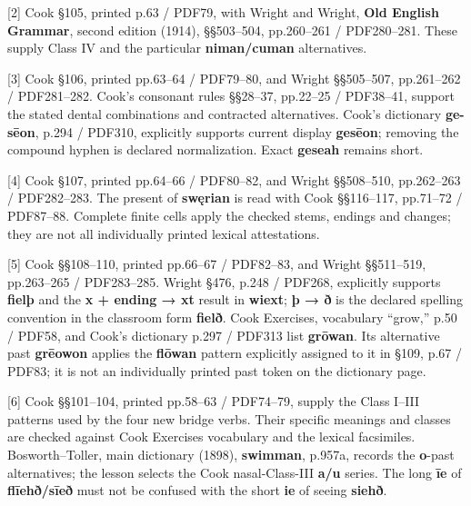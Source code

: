 [2] Cook §105, printed p.63 /\allowbreak{} PDF79, with Wright and Wright, \textbf{Old English Grammar}, second edition (1914), §§503–504, pp.260–261 /\allowbreak{} PDF280–281. These supply Class IV and the particular \textbf{niman/\allowbreak{}cuman} alternatives.

[3] Cook §106, printed pp.63–64 /\allowbreak{} PDF79–80, and Wright §§505–507, pp.261–262 /\allowbreak{} PDF281–282. Cook's consonant rules §§28–37, pp.22–25 /\allowbreak{} PDF38–41, support the stated dental combinations and contracted alternatives. Cook's dictionary \textbf{ge-sēon}, p.294 /\allowbreak{} PDF310, explicitly supports current display \textbf{gesēon}; removing the compound hyphen is declared normalization. Exact \textbf{geseah} remains short.

[4] Cook §107, printed pp.64–66 /\allowbreak{} PDF80–82, and Wright §§508–510, pp.262–263 /\allowbreak{} PDF282–283. The present of \textbf{swęrian} is read with Cook §§116–117, pp.71–72 /\allowbreak{} PDF87–88. Complete finite cells apply the checked stems, endings and changes; they are not all individually printed lexical attestations.

[5] Cook §§108–110, printed pp.66–67 /\allowbreak{} PDF82–83, and Wright §§511–519, pp.263–265 /\allowbreak{} PDF283–285. Wright §476, p.248 /\allowbreak{} PDF268, explicitly supports \textbf{fielþ} and the \textbf{x + ending → xt} result in \textbf{wiext}; \textbf{þ → ð} is the declared spelling convention in the classroom form \textbf{fielð}. Cook Exercises, vocabulary “grow,” p.50 /\allowbreak{} PDF58, and Cook's dictionary p.297 /\allowbreak{} PDF313 list \textbf{grōwan}. Its alternative past \textbf{grēowon} applies the \textbf{flōwan} pattern explicitly assigned to it in §109, p.67 /\allowbreak{} PDF83; it is not an individually printed past token on the dictionary page.

[6] Cook §§101–104, printed pp.58–63 /\allowbreak{} PDF74–79, supply the Class I–III patterns used by the four new bridge verbs. Their specific meanings and classes are checked against Cook Exercises vocabulary and the lexical facsimiles. Bosworth–Toller, main dictionary (1898), \textbf{swimman}, p.957a, records the \textbf{o}-past alternatives; the lesson selects the Cook nasal-Class-III \textbf{a/\allowbreak{}u} series. The long \textbf{īe} of \textbf{flīehð/\allowbreak{}sīeð} must not be confused with the short \textbf{ie} of seeing \textbf{siehð}.

